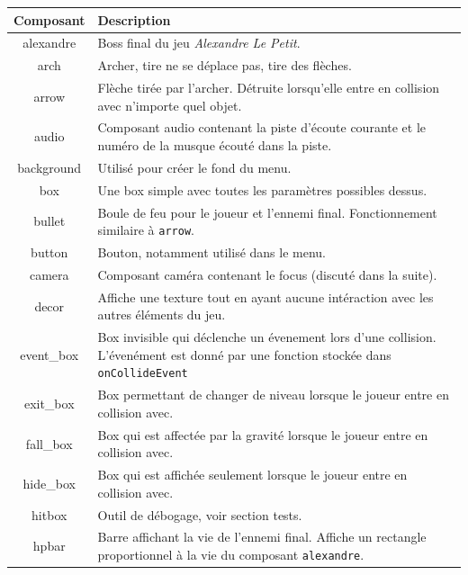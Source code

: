 \documentclass{article}
\begin{document}
\begin{center}
    \begin{tabular}[h]{ |c|p{10cm}| }
        \hline
        \textbf{Composant} & \textbf{Description} \\
        \hline
        alexandre & Boss final du jeu \textit{Alexandre Le Petit}. \\
        \hline
        arch & Archer, tire ne se déplace pas, tire des flèches. \\
        \hline
        arrow & Flèche tirée par l'archer. Détruite lorsqu'elle entre en collision avec n'importe quel objet. \\
        \hline
        audio & Composant audio contenant la piste d'écoute courante et le numéro de la musque écouté dans la 
        piste. \\
        \hline
        background & Utilisé pour créer le fond du menu. \\
        \hline
        box & Une box simple avec toutes les paramètres possibles dessus. \\
        \hline
        bullet & Boule de feu pour le joueur et l'ennemi final. Fonctionnement similaire à \verb|arrow|. \\
        \hline
        button & Bouton, notamment utilisé dans le menu. \\
        \hline
        camera & Composant caméra contenant le focus (discuté dans la suite). \\
        \hline
        decor & Affiche une texture tout en ayant aucune intéraction avec les autres éléments du jeu. \\
        \hline
        event\_box & Box invisible qui déclenche un évenement lors d'une collision. L'évenément est donné 
        par une fonction stockée dans \verb|onCollideEvent| \\
        \hline
        exit\_box & Box permettant de changer de niveau lorsque le joueur entre en collision avec. \\
        \hline
        fall\_box & Box qui est affectée par la gravité lorsque le joueur entre en collision avec. \\
        \hline
        hide\_box & Box qui est affichée seulement lorsque le joueur entre en collision avec. \\
        \hline
        hitbox & Outil de débogage, voir section tests. \\
        \hline
        hpbar & Barre affichant la vie de l'ennemi final. Affiche un rectangle proportionnel à la vie du composant \verb|alexandre|. \\

\end{tabular}
\end{center}
\end{document}
